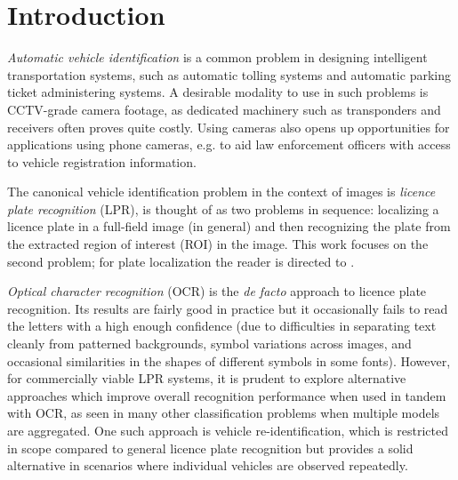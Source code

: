 \documentclass[10pt,twocolumn,letterpaper]{article}
\begin{document}
\section{Introduction \label{sec:Introduction}}
    \emph{Automatic vehicle identification} is a common problem in designing intelligent transportation systems, such as automatic tolling systems and automatic parking ticket administering systems. A desirable modality to use in such problems is CCTV-grade camera footage, as dedicated machinery such as transponders and receivers often proves quite costly. Using cameras also opens up opportunities for applications using phone cameras, e.g.  to aid law enforcement officers with access to vehicle registration information.
    
    The canonical vehicle identification problem in the context of images is \emph{licence plate recognition} (LPR), is thought of as two problems in sequence: localizing a licence plate in a full-field image (in general) and then recognizing the plate from the extracted region of interest (ROI) in the image. This work focuses on the second problem; for plate localization the reader is directed to \cite{redmon2016you}.
    
    \emph{Optical character recognition} (OCR) is the \emph{de facto} approach to licence plate recognition. Its results are fairly good in practice but it occasionally fails to read the letters with a high enough confidence (due to difficulties in separating text cleanly from patterned backgrounds, symbol variations across images, and occasional similarities in the shapes of different symbols in some fonts). However, for commercially viable LPR systems, it is prudent to explore alternative approaches which improve overall recognition performance when used in tandem with OCR, as seen in many other classification problems when multiple models are aggregated. One such approach is vehicle re-identification, which is restricted in scope compared to general licence plate recognition but provides a solid alternative in scenarios where individual vehicles are observed repeatedly.
    
\end{document}
